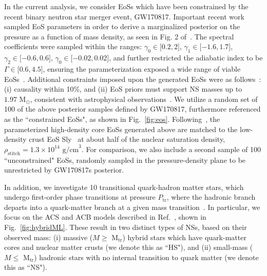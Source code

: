 \documentclass[prd,twocolumn,nofootinbib,superscriptaddress,amsmath,amssymb]{revtex4-1}
\begin{document}
In the current analysis, we consider EoSs which have been constrained by the recent binary neutron star merger event, GW170817.
Important recent work~\cite{LIGO:posterior,Carney:2018sdv} sampled EoS parameters in order to derive a marginalized posterior on the pressure as a function of mass density, as seen in Fig. 2 of~\cite{LIGO:posterior}.
The spectral coefficients were sampled within the ranges: $\gamma_0 \in \lbrack 0.2,2 \rbrack$, $\gamma_1 \in \lbrack -1.6,1.7 \rbrack$, $\gamma_2 \in \lbrack -0.6,0.6 \rbrack$, $\gamma_0 \in \lbrack -0.02,0.02 \rbrack$, and further restricted the adiabatic index to be $\Gamma \in \lbrack 0.6,4.5 \rbrack$, ensuring the parameterization exposed a wide range of viable EoSs~\cite{Lindblom:parameters}.
Additional constraints imposed upon the generated EoSs were as follows~\cite{LIGO:posterior}: (i) causality within 10\%, and (ii) EoS priors must support NS masses up to $1.97 \text{ M}_{\odot}$, consistent with astrophysical observations~\cite{Zhao:massiveNS}.
We utilize a random set of 100 of the above posterior samples defined by GW170817, furthermore referenced as the ``constrained EoSs", as shown in Fig.~\ref{fig:eos}.
Following~\cite{Read2009}, the parameterized high-density core EoSs generated above are matched to the low-density crust EoS Sly~\cite{Douchin:2001sv} at about half of the nuclear saturation density, $\rho_{\text{stitch}}=1.3 \times 10^{14} \text{ g/cm}^3$.
For comparison, we also include a second sample of 100 ``unconstrained" EoSs, randomly sampled in the pressure-density plane to be unrestricted by GW170817s posterior.

In addition, we investigate 10 transitional quark-hadron matter stars, which undergo first-order phase transitions at pressure $P_{\text{tr}}$, where the hadronic branch departs into a quark-matter branch at a given mass transition~\cite{Paschalidis2018,Alford:2017qgh,1971SvA....15..347S,Zdunik:2012dj,Alford:2013aca}.
In particular, we focus on the ACS and ACB models described in Ref.~\cite{Paschalidis2018}, shown in Fig.~\ref{fig:hybridML}.
These result in two distinct types of NSs, based on their observed mass: (i) massive ($M \geq \text{ M}_{\text{tr}}$) hybrid stars which have quark-matter cores and nuclear matter crusts (we denote this as ``HS"), and (ii) small-mass ($M \leq \text{ M}_{\text{tr}}$) hadronic stars with no internal transition to quark matter (we denote this as ``NS").
\end{document}
